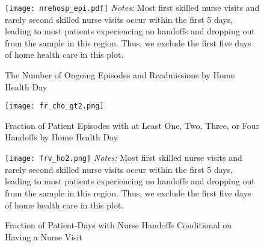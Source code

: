 \documentclass[final,12pt, notitlepage]{article}
\begin{document}
\begin{singlespace}

\graphicspath{ {/Users/kunheekim/Dropbox/Wharton/Research/Labor/gph/anhandoff/} }
\newpage
\begin{figure}[H]
\begin{minipage}{\linewidth}
\centering
\texttt{[image: nrehosp\_epi.pdf]}
\footnotesize
\justify
\emph{Notes:}
Most first skilled nurse visits and rarely second skilled nurse visits occur within the first 5 days, leading to most patients experiencing no handoffs and dropping out from the sample in this region. Thus, we exclude the first five days of home health care in this plot.
\end{minipage}
\caption{The Number of Ongoing Episodes and Readmissions by Home Health Day}
\label{fig:pct_rehosp}
\end{figure}

\graphicspath{ {/Users/kunheekim/Dropbox/Wharton/Research/Labor/gph/anhandoff/} }
\begin{figure}[H]
\begin{minipage}{\linewidth}
\centering
\texttt{[image: fr\_cho\_gt2.png]}
\footnotesize
\justify
\end{minipage}
\caption{Fraction of Patient Episodes with at Least One, Two, Three, or Four Handoffs by Home Health Day}
\label{fig:fr_cho_gt}
\end{figure}

\graphicspath{ {/Users/kunheekim/Dropbox/Wharton/Research/Labor/gph/anhandoff/} }
\begin{figure}[H]
\begin{minipage}{\linewidth}
\centering
\texttt{[image: frv\_ho2.png]}
\footnotesize
\justify
\emph{Notes:}
Most first skilled nurse visits and rarely second skilled nurse visits occur within the first 5 days, leading to most patients experiencing no handoffs and dropping out from the sample in this region. Thus, we exclude the first five days of home health care in this plot.
\end{minipage}
\caption{Fraction of Patient-Days with Nurse Handoffs Conditional on Having a Nurse Visit}
\label{fig:frv_ho}
\end{figure}




\end{singlespace}
\end{document}

